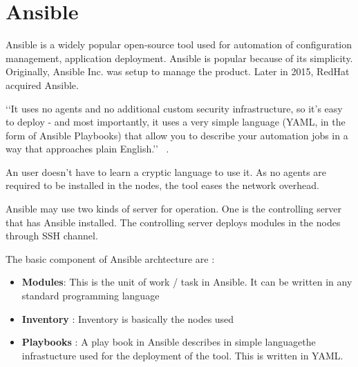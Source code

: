 \section{Ansible}


Ansible is a widely popular open-source tool used for automation of
configuration management, application deployment. Ansible is popular
because of its simplicity. Originally, Ansible Inc.  was setup to
manage the product. Later in 2015, RedHat acquired Ansible.

‘‘It uses no agents and no additional custom security infrastructure,
so it’s easy to deploy - and most importantly, it uses a very simple
language (YAML, in the form of Ansible Playbooks) that allow you to
describe your automation jobs in a way that approaches plain
English.’’  ~\cite {hid-sp18-417-doc-Ansible}.

An user doesn’t have to learn a cryptic language to use it.  As no
agents are required to be installed in the nodes, the tool eases the
network overhead.

Ansible may use two kinds of server for operation. One is the
controlling server that has Ansible installed.  The controlling server
deploys modules in the nodes through SSH channel.

The basic component of Ansible archtecture are : 

\begin{itemize}

\item \textbf{Modules}: This is the unit of work / task in Ansible. It
  can be written in any standard programming language

\item \textbf{Inventory} : Inventory is basically the nodes used

\item \textbf{Playbooks} : A play book in Ansible describes in simple
  languagethe infrastucture used for the deployment of the tool. This
  is written in YAML.

\end{itemize}


